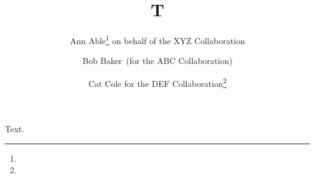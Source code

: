 \documentclass{webofc}
\begin{document}
\title{T}
\author{Ann Able\fnsep\thanks{} on behalf of the XYZ Collaboration
  \and Bob Baker\ (for the ABC Collaboration)
  \and Cat Cole for the DEF Collaboration\fnsep\thanks{}}
\maketitle
Text.
\end{document}
